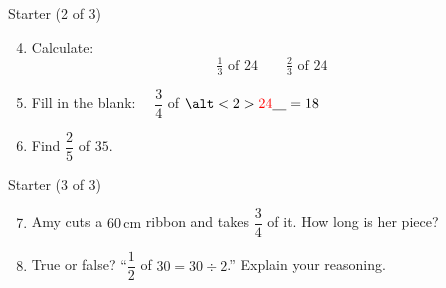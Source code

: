 \documentclass{beamer}
\newcommand{\ablank}[1]{%
  \alt<2>{\textcolor{red}{#1}}{\underline{\phantom{#1}}}%
}
\newcommand{\ashow}[1]{\uncover<2->{\textcolor{red}{\small #1}}}
\begin{document}
\begin{frame}{Starter (2 of 3)}
\small
\begin{enumerate}
\setcounter{enumi}{3}
  \item Calculate:
  \[
    \tfrac{1}{3} \text{ of } 24 \qquad \tfrac{2}{3} \text{ of } 24
  \]
  \ashow{$8$ and $16$}
  \item Fill in the blank: $\quad \dfrac{3}{4}$ of $\ablank{24} = 18$
  \item Find $\dfrac{2}{5}$ of $35$. \ashow{$14$}
\end{enumerate}
\end{frame}


\begin{frame}{Starter (3 of 3)}
\small
\begin{enumerate}
\setcounter{enumi}{6}
  \item Amy cuts a  $60\,\text{cm}$ ribbon and takes $\dfrac{3}{4}$ of it. How long is her piece? \ashow{$45$ cm}
  \item True or false? ``$\dfrac{1}{2}$ of $30 = 30 \div 2$.'' Explain your reasoning.
  \ashow{True. $\tfrac12$ of $30 = 15$ and $30 \div 2 = 15$.}
\end{enumerate}
\end{frame}
\end{document}
